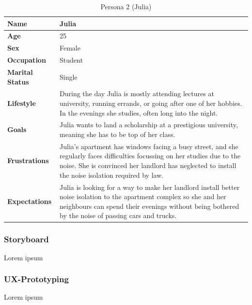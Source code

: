 \begin{table}[H]
    \centering
    \begin{tabularx}{\textwidth}{l X}
        \toprule
        \textbf{Name} & Julia \\
        \midrule
        \textbf{Age} & 25 \\
        \midrule
        \textbf{Sex} & Female \\
        \midrule
        \textbf{Occupation} & Student \\
        \midrule
        \textbf{Marital Status} & Single \\
        \midrule
        \textbf{Lifestyle} & During the day Julia is mostly attending lectures at university, running errands, or going after one of her hobbies.
        In the evenings she studies, often long into the night. \\
        \midrule
        \textbf{Goals} & Julia wants to land a scholarship at a prestigious university, meaning she has to be top of her class. \\
        \midrule
        \textbf{Frustrations} & Julia's apartment has windows facing a busy street, and she regularly faces difficulties focussing on her studies
        due to the noise. She is convinced her landlord has neglected to install the noise isolation required by law. \\
        \midrule
        \textbf{Expectations} & Julia is looking for a way to make her landlord install better noise isolation to the apartment complex so she and
        her neighbours can spend their evenings without being bothered by the noise of passing cars and trucks. \\
        \bottomrule
    \end{tabularx}
    \caption{Persona 2 (Julia)}\label{table:persona2}
\end{table}

\subsubsection{Storyboard}\label{subsubsec:storyboard}
Lorem ipsum

\subsubsection{UX-Prototyping}\label{subsubsec:ux_prototyping}
Lorem ipsum